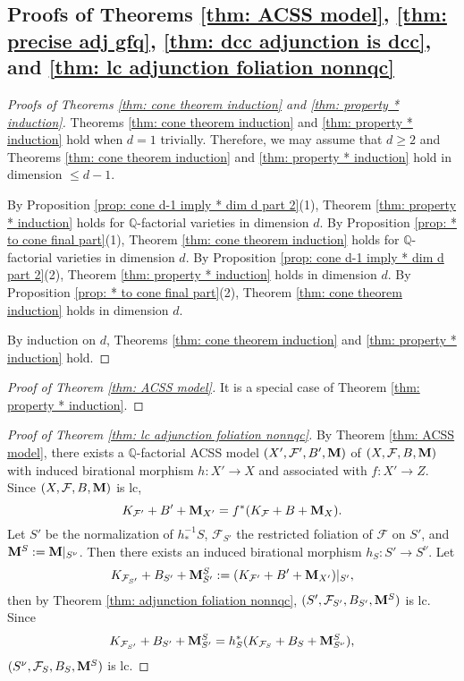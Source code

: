 \documentclass[11pt]{amsart}
\numberwithin{equation}{section}
\newcommand{\Mm}{{\bf{M}}}
\newcommand{\Qq}{\mathbb{Q}}
\newcommand{\Ff}{\mathcal{F}}
\theoremstyle{definition}
\theoremstyle{definition}
\theoremstyle{definition}
\begin{document}
\subsection{Proofs of  Theorems \ref{thm:  ACSS model}, \ref{thm: precise adj gfq}, \ref{thm: dcc adjunction is dcc}, and \ref{thm: lc adjunction foliation nonnqc}}\label{subsec: proof of adj}


\begin{proof}[Proofs of Theorems \ref{thm: cone theorem induction} and \ref{thm: property * induction}]
Theorems \ref{thm: cone theorem induction} and \ref{thm: property * induction} hold when $d=1$ trivially. Therefore, we may assume that $d\geq 2$ and Theorems \ref{thm: cone theorem induction} and \ref{thm: property * induction} hold in dimension $\leq d-1$.

By Proposition \ref{prop: cone d-1 imply * dim d part 2}(1), Theorem \ref{thm: property * induction} holds for $\Qq$-factorial varieties in dimension $d$. By Proposition \ref{prop: * to cone final part}(1), Theorem \ref{thm: cone theorem induction} holds for $\Qq$-factorial varieties in dimension $d$. By Proposition \ref{prop: cone d-1 imply * dim d part 2}(2), Theorem \ref{thm: property * induction} holds in dimension $d$. By  Proposition \ref{prop: * to cone final part}(2), Theorem \ref{thm: cone theorem induction} holds in dimension $d$.

By induction on $d$, Theorems \ref{thm: cone theorem induction} and \ref{thm: property * induction} hold.
\end{proof}


\begin{proof}[Proof of Theorem \ref{thm:  ACSS model}]
    It is a special case of Theorem \ref{thm: property * induction}.
\end{proof}


\begin{proof}[Proof of Theorem \ref{thm: lc adjunction foliation nonnqc}]
 By Theorem \ref{thm:  ACSS model}, there exists a $\Qq$-factorial ACSS model $(X',\Ff',B',\Mm)$ of $(X,\Ff,B,\Mm)$ with induced birational morphism $h: X'\rightarrow X$ and associated with $f: X'\rightarrow Z$. Since  $(X,\Ff,B,\Mm)$ is lc,
 $$K_{\Ff'}+B'+\Mm_{X'}=f^*(K_{\Ff}+B+\Mm_X).$$
 Let $S'$ be the normalization of $h^{-1}_*S$, $\Ff_{S'}$ the restricted foliation of $\Ff$ on $S'$, and $\Mm^S:=\Mm|_{S^\nu}$. Then there exists an induced birational morphism $h_S: S'\rightarrow S^\nu$. Let
 $$K_{\Ff_{S'}}+B_{S'}+\Mm^S_{S'}:=(K_{\Ff'}+B'+\Mm_{X'})|_{S'},$$
 then by Theorem \ref{thm: adjunction foliation nonnqc}, $(S',\Ff_{S'},B_{S'},\Mm^S)$ is lc. Since
 $$K_{\Ff_{S'}}+B_{S'}+\Mm^S_{S'}=h_S^*(K_{\Ff_S}+B_S+\Mm^S_{S^\nu}),$$
 $(S^\nu,\Ff_S,B_S,\Mm^S)$ is lc. 
  \end{proof}
\end{document}

